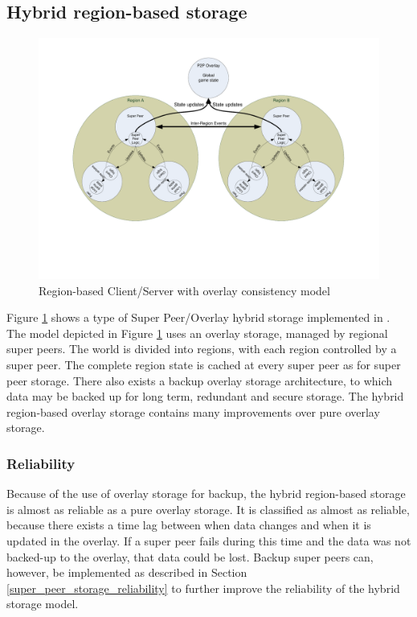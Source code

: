 \documentclass[10pt,a4paper,journal,cspaper,compsoc]{IEEEtran}
\begin{document}
\subsection{Hybrid region-based storage}
\label{hybrid_storage}

\begin{figure}[htbp]
 \centering
 \includegraphics[clip=true, viewport=2cm 5cm 27cm 19.5cm, width=\textwidth]{region_based_CS_CM_P2PO}
 \caption{Region-based Client/Server with overlay consistency model}
 \label{fig_cs_region_o_cm}
\end{figure}
%
Figure \ref{fig_cs_region_o_cm} shows a type of Super Peer/Overlay hybrid storage implemented in \cite{zoned_federation}. The model depicted in
Figure \ref{fig_cs_region_o_cm} uses an overlay storage, managed by regional super peers. The world is divided into regions, with each region
controlled by a super peer. The complete region state is cached at every super peer as for super peer storage. There also exists a backup overlay
storage architecture, to which data may be backed up for long term, redundant and secure storage. The hybrid region-based overlay storage contains
many improvements over pure overlay storage.

\subsubsection{Reliability}
\label{hybrid_storage_reliability}

Because of the use of overlay storage for backup, the hybrid region-based storage is almost as reliable as a pure overlay storage. It is classified
as almost as reliable, because there exists a time lag between when data changes and when it is updated in the overlay. If a super peer fails during
this time and the data was not backed-up to the overlay, that data could be lost. Backup super peers can, however, be implemented as described in
Section \ref{super_peer_storage_reliability} to further improve the reliability of the hybrid storage model.
\end{document}
